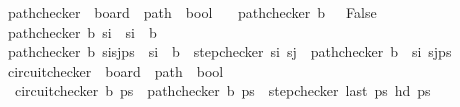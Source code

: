 \begin{isabellebody}
\isanewline
{}\isamarkupfalse%
\ path{\isacharunderscore}{\kern0pt}checker\ {\isacharcolon}{\kern0pt}{\isacharcolon}{\kern0pt}\ {\isachardoublequoteopen}board\ {\isasymRightarrow}\ path\ {\isasymRightarrow}\ bool{\isachardoublequoteclose}\ \isanewline
\ \ {\isachardoublequoteopen}path{\isacharunderscore}{\kern0pt}checker\ b\ {\isacharbrackleft}{\kern0pt}{\isacharbrackright}{\kern0pt}\ {\isacharequal}{\kern0pt}\ False{\isachardoublequoteclose}\isanewline
{\isacharbar}{\kern0pt}\ {\isachardoublequoteopen}path{\isacharunderscore}{\kern0pt}checker\ b\ {\isacharbrackleft}{\kern0pt}s\isactrlsub i{\isacharbrackright}{\kern0pt}\ {\isacharequal}{\kern0pt}\ {\isacharparenleft}{\kern0pt}{\isacharbraceleft}{\kern0pt}s\isactrlsub i{\isacharbraceright}{\kern0pt}\ {\isacharequal}{\kern0pt}\ b{\isacharparenright}{\kern0pt}{\isachardoublequoteclose}\isanewline
{\isacharbar}{\kern0pt}\ {\isachardoublequoteopen}path{\isacharunderscore}{\kern0pt}checker\ b\ {\isacharparenleft}{\kern0pt}s\isactrlsub i{\isacharhash}{\kern0pt}s\isactrlsub j{\isacharhash}{\kern0pt}ps{\isacharparenright}{\kern0pt}\ {\isacharequal}{\kern0pt}\ {\isacharparenleft}{\kern0pt}s\isactrlsub i\ {\isasymin}\ b\ {\isasymand}\ step{\isacharunderscore}{\kern0pt}checker\ s\isactrlsub i\ s\isactrlsub j\ {\isasymand}\ path{\isacharunderscore}{\kern0pt}checker\ {\isacharparenleft}{\kern0pt}b\ {\isacharminus}{\kern0pt}\ {\isacharbraceleft}{\kern0pt}s\isactrlsub i{\isacharbraceright}{\kern0pt}{\isacharparenright}{\kern0pt}\ {\isacharparenleft}{\kern0pt}s\isactrlsub j{\isacharhash}{\kern0pt}ps{\isacharparenright}{\kern0pt}{\isacharparenright}{\kern0pt}{\isachardoublequoteclose}\isanewline
\isanewline
{}\isamarkupfalse%
\ circuit{\isacharunderscore}{\kern0pt}checker\ {\isacharcolon}{\kern0pt}{\isacharcolon}{\kern0pt}\ {\isachardoublequoteopen}board\ {\isasymRightarrow}\ path\ {\isasymRightarrow}\ bool{\isachardoublequoteclose}\ \isanewline
\ \ {\isachardoublequoteopen}circuit{\isacharunderscore}{\kern0pt}checker\ b\ ps\ {\isacharequal}{\kern0pt}\ {\isacharparenleft}{\kern0pt}path{\isacharunderscore}{\kern0pt}checker\ b\ ps\ {\isasymand}\ step{\isacharunderscore}{\kern0pt}checker\ {\isacharparenleft}{\kern0pt}last\ ps{\isacharparenright}{\kern0pt}\ {\isacharparenleft}{\kern0pt}hd\ ps{\isacharparenright}{\kern0pt}{\isacharparenright}{\kern0pt}{\isachardoublequoteclose}%
\isadelimdocument
%
\endisadelimdocument
%
\isatagdocument
%
\isamarkuptrue%
%
\endisatagdocument
{\isafolddocument}%
%

\end{isabellebody}
